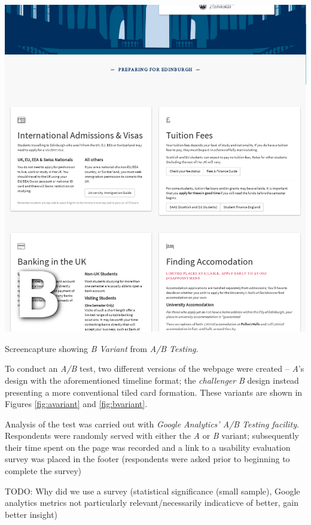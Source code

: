 \documentclass[a4paper, notoc]{tufte-handout}
\begin{document}
\begin{marginfigure}
  \includegraphics[width=\linewidth]{bvariant.png}
  \caption{
    \label{fig:bvariant}
    Screencapture showing \textit{B Variant} from \textit{A/B Testing}.
  }

\end{marginfigure}

To conduct an \textit{A/B} test, two different versions of the webpage were created -- 
\textit{A}'s design with the aforementioned timeline format; the \textit{challenger} 
\textit{B} design instead presenting a more conventional tiled card formation. These variants 
are shown in Figures \ref{fig:avariant} and \ref{fig:bvariant}.

Analysis of the test was carried out with \textit{Google Analytics' A/B Testing facility}. 
Respondents were randomly served with either the \textit{A} or \textit{B} variant; subsequently 
their time spent on the page was recorded and a link to a usability evaluation survey was
placed in the footer (respondents were asked prior to beginning to complete the survey)

TODO: Why did we use a survey (statistical significance (small sample), Google analytics metrics not
particularly relevant/necessarily indicaticve of better, gain better insight)
\end{document}
